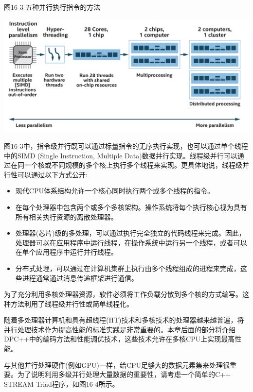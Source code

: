 \hspace*{\fill} \par %
图16-3 五种并行执行指令的方法
\begin{center}
	\includegraphics[width=1.0\textwidth]{content/chapter-16/images/4}
\end{center}

图16-3中，指令级并行既可以通过标量指令的无序执行实现，也可以通过单个线程中的SIMD (Single Instruction, Multiple Data)数据并行实现。线程级并行可以通过在同一个核或不同规模的多个核上执行多个线程来实现。更具体地说，线程级并行性可以通过以下方式公开:\par

\begin{itemize}
	\item 现代CPU体系结构允许一个核心同时执行两个或多个线程的指令。
	\item 在每个处理器中包含两个或多个多核架构。操作系统将每个执行核心视为具有所有相关执行资源的离散处理器。
	\item 处理器(芯片)级的多处理，可以通过执行完全独立的代码线程来完成。因此，处理器可以在应用程序中运行线程，在操作系统中运行另一个线程，或者可以在单个应用程序中运行并行线程。
	\item 分布式处理，可以通过在计算机集群上执行由多个线程组成的进程来完成，这些进程通常通过消息传递框架进行通信。
\end{itemize}

为了充分利用多核处理器资源，软件必须将工作负载分散到多个核的方式编写。这种方法利用了线程级并行性或简单线程化。\par

随着多处理器计算机和具有超线程(HT)技术和多核技术的处理器越来越普遍，将并行处理技术作为提高性能的标准实践是非常重要的。本章后面的部分将介绍DPC++中的编码方法和性能调优技术，这些技术允许在多核CPU上实现最高性能。\par

与其他并行处理硬件(例如GPU)一样，给CPU足够大的数据元素集来处理很重要。为了说明利用多级并行处理大量数据的重要性，请考虑一个简单的C++ STREAM Triad程序，如图16-4所示。\par


